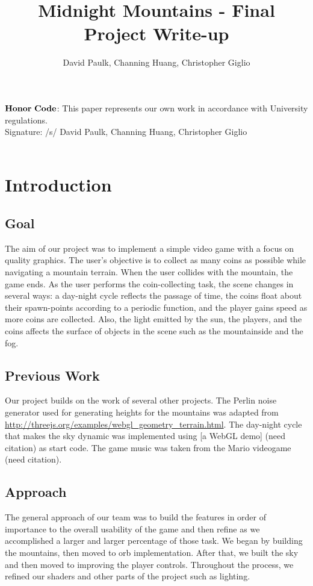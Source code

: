\documentclass{article}
\begin{document}
\title{Midnight Mountains - Final Project Write-up}
\author{David Paulk, Channing Huang, Christopher Giglio\\}
\date{}
\maketitle

\thispagestyle{empty}

\noindent 
$\bf{Honor \ Code}$: This paper represents our own work in accordance with University regulations.\\
Signature: /s/ David Paulk, Channing Huang, Christopher Giglio
\\ \\
\section{Introduction}
\subsection{Goal}
The aim of our project was to implement a simple video game with a focus on quality graphics.  The user's objective is to collect as many coins as possible while navigating a mountain terrain.  When the user collides with the mountain, the game ends.  As the user performs the coin-collecting task, the scene changes in several ways: a day-night cycle reflects the passage of time, the coins float about their spawn-points according to a periodic function, and the player gains speed as more coins are collected.  Also, the light emitted by the sun, the players, and the coins affects the surface of objects in the scene such as the mountainside and the fog.

\subsection{Previous Work}
Our project builds on the work of several other projects.  The Perlin noise generator used for generating heights for the mountains was adapted from \url{http://threejs.org/examples/webgl_geometry_terrain.html}.  The day-night cycle that makes the sky dynamic was implemented using [a WebGL demo] (need citation) as start code. The game music was taken from the Mario videogame (need citation).
 
\subsection{Approach}
The general approach of our team was to build the features in order of importance to the overall usability of the game and then refine as we accomplished a larger and larger percentage of those task. We began by building the mountains, then moved to orb implementation. After that, we built the sky and then moved to improving the player controls. Throughout the process, we refined our shaders and other parts of the project such as lighting.
\end{document}
